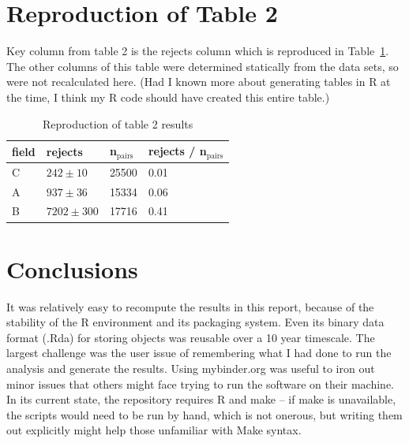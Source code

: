\hypertarget{reproduction-of-table-2}{%
\section{Reproduction of Table 2}\label{reproduction-of-table-2}}

Key column from table 2 is the rejects column which is reproduced in
Table~\ref{tab:rep}.  The other columns of this table were determined
statically from the data sets, so were not recalculated here.  (Had I
known more about generating tables in R at the time, I think my R code
should have created this entire table.)


\begin{table}[h!]
  \centering
  \begin{tabular}{llll}
    \hline
    field & rejects & n$_{\mathrm{pairs}}$ & rejects / n$_{\mathrm{pairs}}$ \\ \hline
    C & $242 \pm 10$ & 25500 & 0.01\\
    A & $937 \pm 36$ & 15334 & 0.06\\
    B & $7202 \pm 300$ & 17716 & 0.41\\
    \hline
  \end{tabular}
  \caption{Reproduction of table 2 results}
  \label{tab:rep}
\end{table}



\section{Conclusions}

It was relatively easy to recompute the results in this report, because
of the stability of the R environment and its packaging system. Even its
binary data format (.Rda) for storing objects was reusable over a 10
year timescale. The largest challenge was the user issue of remembering
what I had done to run the analysis and generate the results. Using
mybinder.org was useful to iron out minor issues that others might face
trying to run the software on their machine. In its current state, the
repository requires R and make -- if make is unavailable, the scripts
would need to be run by hand, which is not onerous, but writing them out
explicitly might help those unfamiliar with Make syntax.

